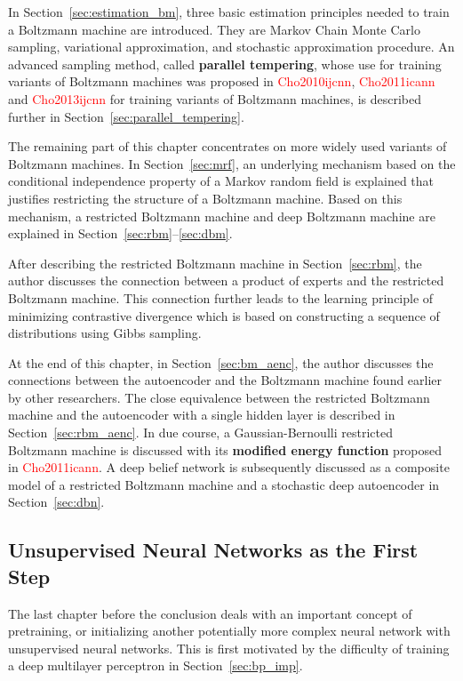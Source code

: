 \documentclass{now}
\newcommand{\alert}[1]{\textcolor{red}{#1}}
\newcommand{\citepub}[1]{\alert{#1}}
\begin{document}
In Section~\ref{sec:estimation_bm}, three basic estimation
principles needed to train a Boltzmann machine are
introduced. They are Markov Chain Monte Carlo
sampling, variational approximation, and
stochastic approximation procedure. An advanced
sampling method, called \textbf{parallel
tempering}, whose use for training variants of Boltzmann
machines was proposed in \citepub{Cho2010ijcnn},
\citepub{Cho2011icann} and \citepub{Cho2013ijcnn} for
training variants of Boltzmann machines, is described
further in Section~\ref{sec:parallel_tempering}.

The remaining part of this chapter concentrates on more
widely used variants of Boltzmann machines. In
Section~\ref{sec:mrf}, an underlying mechanism based on the
conditional independence property of a Markov random field
is explained that justifies restricting the structure of a
Boltzmann machine. Based on this mechanism, a
restricted Boltzmann machine and deep
Boltzmann machine are explained in
Section~\ref{sec:rbm}--\ref{sec:dbm}.

After describing the restricted Boltzmann machine in
Section~\ref{sec:rbm}, the author discusses the connection
between a product of experts and the restricted Boltzmann
machine. This connection further leads to the learning
principle of minimizing contrastive divergence
which is based on constructing a sequence of distributions
using Gibbs sampling.

At the end of this chapter, in Section~\ref{sec:bm_aenc},
the author discusses the connections between the autoencoder
and the Boltzmann machine found earlier by other
researchers. The close equivalence between the restricted
Boltzmann machine and the autoencoder with a single hidden
layer is described in Section~\ref{sec:rbm_aenc}. In due
course, a Gaussian-Bernoulli restricted
Boltzmann machine is discussed with its \textbf{modified
energy function} proposed in \citepub{Cho2011icann}. A
deep belief network is subsequently discussed as a
composite model of a restricted Boltzmann machine and a
stochastic deep autoencoder in Section~\ref{sec:dbn}.


\subsection{Unsupervised Neural Networks as the First Step}

The last chapter before the conclusion deals with an
important concept of pretraining, or initializing another
potentially more complex neural network with unsupervised
neural networks. This is first motivated by the difficulty
of training a deep multilayer perceptron 
in Section~\ref{sec:bp_imp}.
\end{document}
